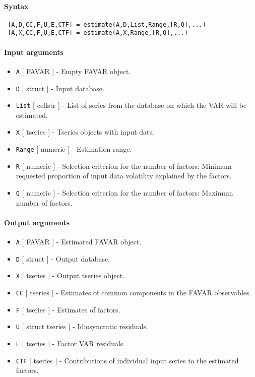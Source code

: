 


	\paragraph{Syntax}
 
 \begin{verbatim}
 [A,D,CC,F,U,E,CTF] = estimate(A,D,List,Range,[R,Q],...)
 [A,X,CC,F,U,E,CTF] = estimate(A,X,Range,[R,Q],...)
 \end{verbatim}
 
 \paragraph{Input arguments}
 
 \begin{itemize}
 \item
   \texttt{A} {[} FAVAR {]} - Empty FAVAR object.
 \item
   \texttt{D} {[} struct {]} - Input database.
 \item
   \texttt{List} {[} cellstr {]} - List of series from the database on
   which the VAR will be estimated.
 \item
   \texttt{X} {[} tseries {]} - Tseries objects with input data.
 \item
   \texttt{Range} {[} numeric {]} - Estimation range.
 \item
   \texttt{R} {[} numeric {]} - Selection criterion for the number of
   factors: Minimum requested proportion of input data volatility
   explained by the factors.
 \item
   \texttt{Q} {[} numeric {]} - Selection criterion for the number of
   factors: Maximum number of factors.
 \end{itemize}
 
 \paragraph{Output arguments}
 
 \begin{itemize}
 \item
   \texttt{A} {[} FAVAR {]} - Estimated FAVAR object.
 \item
   \texttt{D} {[} struct {]} - Output database.
 \item
   \texttt{X} {[} tseries {]} - Output tseries object.
 \item
   \texttt{CC} {[} tseries {]} - Estimates of common components in the
   FAVAR observables.
 \item
   \texttt{F} {[} tseries {]} - Estimates of factors.
 \item
   \texttt{U} {[} struct \textbar{} tseries {]} - Idiosyncratic
   residuals.
 \item
   \texttt{E} {[} tseries {]} - Factor VAR residuals.
 \item
   \texttt{CTF} {[} tseries {]} - Contributions of individual input
   series to the estimated factors.
 \end{itemize}
 
